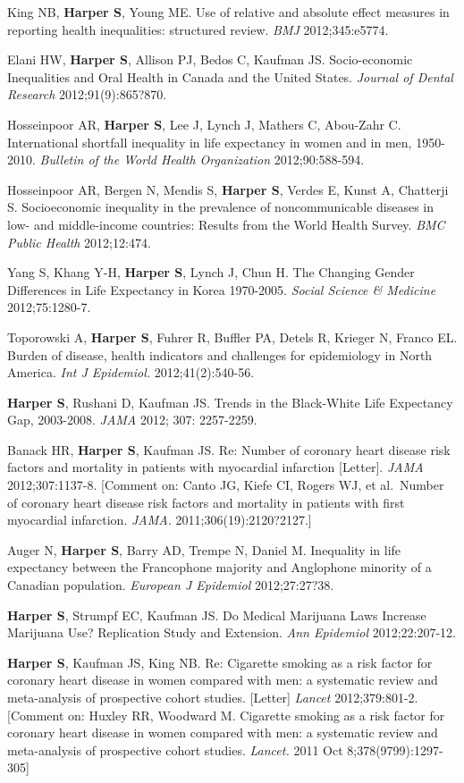 \documentclass[
  letterpaper,
  DIV=11,
  numbers=noendperiod]{scrartcl}
\begin{document}
King NB, \textbf{Harper S}, Young ME. Use of relative and absolute
effect measures in reporting health inequalities: structured review.
\emph{BMJ} 2012;345:e5774.

Elani HW, \textbf{Harper S}, Allison PJ, Bedos C, Kaufman JS.
Socio-economic Inequalities and Oral Health in Canada and the United
States. \emph{Journal of Dental Research} 2012;91(9):865?870.

Hosseinpoor AR, \textbf{Harper S}, Lee J, Lynch J, Mathers C, Abou-Zahr
C. International shortfall inequality in life expectancy in women and in
men, 1950-2010. \emph{Bulletin of the World Health Organization}
2012;90:588-594.

Hosseinpoor AR, Bergen N, Mendis S, \textbf{Harper S}, Verdes E, Kunst
A, Chatterji S. Socioeconomic inequality in the prevalence of
noncommunicable diseases in low- and middle-income countries: Results
from the World Health Survey. \emph{BMC Public Health} 2012;12:474.

Yang S, Khang Y-H, \textbf{Harper S}, Lynch J, Chun H. The Changing
Gender Differences in Life Expectancy in Korea 1970-2005. \emph{Social
Science \& Medicine} 2012;75:1280-7.

Toporowski A, \textbf{Harper S}, Fuhrer R, Buffler PA, Detels R, Krieger
N, Franco EL. Burden of disease, health indicators and challenges for
epidemiology in North America. \emph{Int J Epidemiol.}
2012;41(2):540-56.

\textbf{Harper S}, Rushani D, Kaufman JS. Trends in the Black-White Life
Expectancy Gap, 2003-2008. \emph{JAMA} 2012; 307: 2257-2259.

Banack HR, \textbf{Harper S}, Kaufman JS. Re: Number of coronary heart
disease risk factors and mortality in patients with myocardial
infarction {[}Letter{]}. \emph{JAMA} 2012;307:1137-8. {[}Comment on:
Canto JG, Kiefe CI, Rogers WJ, et al.~Number of coronary heart disease
risk factors and mortality in patients with first myocardial infarction.
\emph{JAMA.} 2011;306(19):2120?2127.{]}

Auger N, \textbf{Harper S}, Barry AD, Trempe N, Daniel M. Inequality in
life expectancy between the Francophone majority and Anglophone minority
of a Canadian population. \emph{European J Epidemiol} 2012;27:27?38.

\textbf{Harper S}, Strumpf EC, Kaufman JS. Do Medical Marijuana Laws
Increase Marijuana Use? Replication Study and Extension. \emph{Ann
Epidemiol} 2012;22:207-12.

\textbf{Harper S}, Kaufman JS, King NB. Re: Cigarette smoking as a risk
factor for coronary heart disease in women compared with men: a
systematic review and meta-analysis of prospective cohort studies.
{[}Letter{]} \emph{Lancet} 2012;379:801-2. {[}Comment on: Huxley RR,
Woodward M. Cigarette smoking as a risk factor for coronary heart
disease in women compared with men: a systematic review and
meta-analysis of prospective cohort studies. \emph{Lancet.} 2011 Oct
8;378(9799):1297-305{]}
\end{document}
